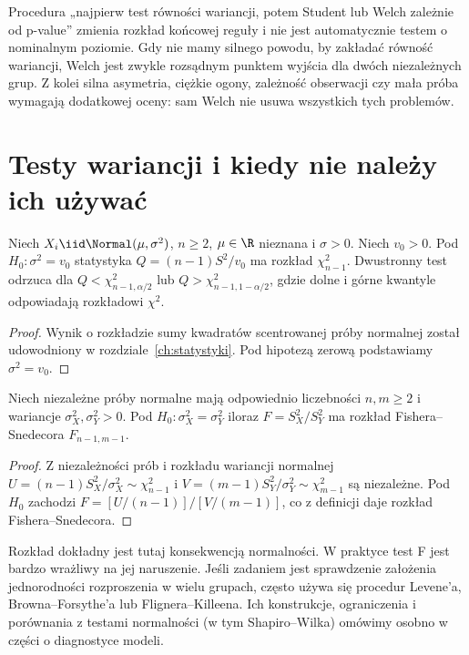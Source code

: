 \begin{uwaga}
Procedura „najpierw test równości wariancji, potem Student lub
Welch zależnie od p-value” zmienia rozkład końcowej reguły i
nie jest automatycznie testem o nominalnym poziomie.
Gdy nie mamy silnego powodu, by zakładać równość wariancji,
Welch jest zwykle rozsądnym punktem wyjścia dla dwóch
niezależnych grup. Z kolei silna asymetria, ciężkie ogony,
zależność obserwacji czy mała próba wymagają dodatkowej oceny:
sam Welch nie usuwa wszystkich tych problemów.
\end{uwaga}

\section{Testy wariancji i kiedy nie należy ich używać}
\begin{twierdzenie}
Niech $X_i\iid\Normal(\mu,\sigma^2)$, $n\ge2$,
$\mu\in\R$ nieznana i $\sigma>0$. Niech $v_0>0$. Pod $H_0:\sigma^2=v_0$
statystyka $Q=(n-1)S^2/v_0$ ma rozkład
$\chi^2_{n-1}$. Dwustronny test odrzuca dla
$Q<\chi^2_{n-1,\alpha/2}$ lub
$Q>\chi^2_{n-1,1-\alpha/2}$, gdzie dolne i górne
kwantyle odpowiadają rozkładowi $\chi^2$.
\end{twierdzenie}
\begin{proof}
Wynik o rozkładzie sumy kwadratów scentrowanej próby
normalnej został udowodniony w rozdziale~\ref{ch:statystyki}.
Pod hipotezą zerową podstawiamy $\sigma^2=v_0$.
\end{proof}

\begin{twierdzenie}
Niech niezależne próby normalne mają odpowiednio
liczebności $n,m\ge2$ i wariancje $\sigma_X^2,\sigma_Y^2>0$.
Pod $H_0:\sigma_X^2=\sigma_Y^2$ iloraz
$F=S_X^2/S_Y^2$ ma rozkład Fishera--Snedecora
$F_{n-1,m-1}$.
\end{twierdzenie}
\begin{proof}
Z niezależności prób i rozkładu wariancji normalnej
$U=(n-1)S_X^2/\sigma_X^2\sim\chi^2_{n-1}$ i
$V=(m-1)S_Y^2/\sigma_Y^2\sim\chi^2_{m-1}$ są
niezależne. Pod $H_0$ zachodzi
$F=[U/(n-1)]/[V/(m-1)]$, co z definicji daje
rozkład Fishera--Snedecora.
\end{proof}

Rozkład dokładny jest tutaj konsekwencją normalności.
W praktyce test F jest bardzo wrażliwy na jej naruszenie.
Jeśli zadaniem jest sprawdzenie założenia jednorodności
rozproszenia w wielu grupach, często używa się procedur
Levene'a, Browna--Forsythe'a lub Flignera--Killeena.
Ich konstrukcje, ograniczenia i porównania z testami
normalności (w tym Shapiro--Wilka) omówimy osobno w części
o diagnostyce modeli.

